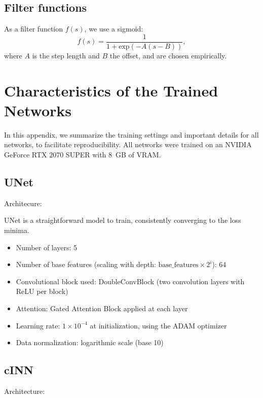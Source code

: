 \documentclass{aa}
\begin{document}
\begin{appendix}
   \subsection{Filter functions}
   As a filter function $f(s)$, we use a sigmoid:
   \begin{equation}
      f(s)=\frac{1}{1+\mathrm{exp}(-A(s-B))},
   \end{equation}
   where $A$ is the step length and $B$ the offset, and are chosen empirically.

\FloatBarrier

\section{Characteristics of the Trained Networks}
\label{appendix:char_networks}

In this appendix, we summarize the training settings and important details for all networks, to facilitate reproducibility. 
All networks were trained on an NVIDIA GeForce RTX 2070 SUPER with 8~GB of VRAM.

   \subsection{UNet}
      Architecure: \cite{oktayAttentionUNetLearning2018}
      
      UNet is a straightforward model to train, consistently converging to the loss minima.
      \begin{itemize}
         \item Number of layers: 5
         \item Number of base features (scaling with depth: $\text{base\_features} \times 2^i$): 64
         \item Convolutional block used: DoubleConvBlock (two convolution layers with ReLU per block)
         \item Attention: Gated Attention Block applied at each layer \citep{oktayAttentionUNetLearning2018}
         \item Learning rate: $1\times10^{-4}$ at initialization, using the ADAM optimizer
         \item Data normalization: logarithmic scale (base 10)
      \end{itemize}
   \subsection{cINN} 
      Architecture: \cite{ardizzoneConditionalInvertibleNeural2021}
      

\end{appendix}
\end{document}
